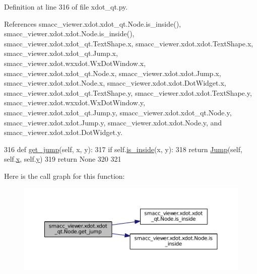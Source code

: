 Definition at line 316 of file xdot\+\_\+qt.\+py.



References smacc\+\_\+viewer.\+xdot.\+xdot\+\_\+qt.\+Node.\+is\+\_\+inside(), smacc\+\_\+viewer.\+xdot.\+xdot.\+Node.\+is\+\_\+inside(), smacc\+\_\+viewer.\+xdot.\+xdot\+\_\+qt.\+Text\+Shape.\+x, smacc\+\_\+viewer.\+xdot.\+xdot.\+Text\+Shape.\+x, smacc\+\_\+viewer.\+xdot.\+xdot\+\_\+qt.\+Jump.\+x, smacc\+\_\+viewer.\+xdot.\+wxxdot.\+Wx\+Dot\+Window.\+x, smacc\+\_\+viewer.\+xdot.\+xdot\+\_\+qt.\+Node.\+x, smacc\+\_\+viewer.\+xdot.\+xdot.\+Jump.\+x, smacc\+\_\+viewer.\+xdot.\+xdot.\+Node.\+x, smacc\+\_\+viewer.\+xdot.\+xdot.\+Dot\+Widget.\+x, smacc\+\_\+viewer.\+xdot.\+xdot\+\_\+qt.\+Text\+Shape.\+y, smacc\+\_\+viewer.\+xdot.\+xdot.\+Text\+Shape.\+y, smacc\+\_\+viewer.\+xdot.\+wxxdot.\+Wx\+Dot\+Window.\+y, smacc\+\_\+viewer.\+xdot.\+xdot\+\_\+qt.\+Jump.\+y, smacc\+\_\+viewer.\+xdot.\+xdot\+\_\+qt.\+Node.\+y, smacc\+\_\+viewer.\+xdot.\+xdot.\+Jump.\+y, smacc\+\_\+viewer.\+xdot.\+xdot.\+Node.\+y, and smacc\+\_\+viewer.\+xdot.\+xdot.\+Dot\+Widget.\+y.


\begin{DoxyCode}
316     \textcolor{keyword}{def }\hyperlink{classsmacc__viewer_1_1xdot_1_1xdot__qt_1_1Node_a24e7ffc56c0660c97aba2ddcde328dbb}{get\_jump}(self, x, y):
317         \textcolor{keywordflow}{if} self.\hyperlink{classsmacc__viewer_1_1xdot_1_1xdot__qt_1_1Node_a02f21863c16541b673dc4d8ebeafbf00}{is\_inside}(x, y):
318             \textcolor{keywordflow}{return} \hyperlink{classsmacc__viewer_1_1xdot_1_1xdot__qt_1_1Jump}{Jump}(self, self.\hyperlink{classsmacc__viewer_1_1xdot_1_1xdot__qt_1_1Node_a85d5d46a7ec138627e137f9cefd5a0ad}{x}, self.\hyperlink{classsmacc__viewer_1_1xdot_1_1xdot__qt_1_1Node_a61b07e1b4eebf60613eaed0a5e1204e4}{y})
319         \textcolor{keywordflow}{return} \textcolor{keywordtype}{None}
320 
321 
\end{DoxyCode}


Here is the call graph for this function\+:
\nopagebreak
\begin{figure}[H]
\begin{center}
\leavevmode
\includegraphics[width=350pt]{classsmacc__viewer_1_1xdot_1_1xdot__qt_1_1Node_a24e7ffc56c0660c97aba2ddcde328dbb_cgraph}
\end{center}
\end{figure}


